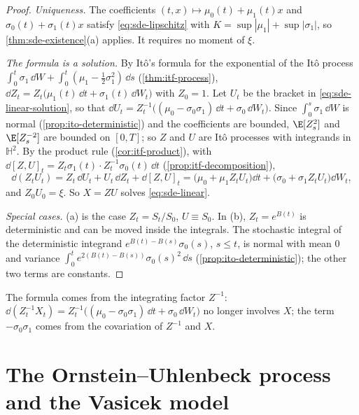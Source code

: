 \begin{proof}
\emph{Uniqueness.} The coefficients $(t,x)\mapsto\mu_0(t)+\mu_1(t)x$ and
$\sigma_0(t)+\sigma_1(t)x$ satisfy \eqref{eq:sde-lipschitz} with
$K=\sup|\mu_1|+\sup|\sigma_1|$, so \cref{thm:sde-existence}(a) applies. It requires no
moment of $\xi$.

\emph{The formula is a solution.} By It\^o's formula for the exponential of the It\^o
process $\int_0^t\sigma_1\,\dd W+\int_0^t(\mu_1-\frac12\sigma_1^2)\,\dd s$ (\cref{thm:itf-process}),
$\dd Z_t=Z_t\big(\mu_1(t)\,\dd t+\sigma_1(t)\,\dd W_t\big)$ with $Z_0=1$. Let $U_t$ be the
bracket in \eqref{eq:sde-linear-solution}, so that
$\dd U_t=Z_t^{-1}\big((\mu_0-\sigma_0\sigma_1)\,\dd t+\sigma_0\,\dd W_t\big)$. Since
$\int_0^s\sigma_1\,\dd W$ is normal (\cref{prop:ito-deterministic}) and the coefficients are
bounded, $\E[Z_s^2]$ and $\E[Z_s^{-2}]$ are bounded on $[0,T]$; so $Z$ and $U$ are It\^o
processes with integrands in $\mathbb H^2$. By the product rule
(\cref{cor:itf-product}), with $\dd[Z,U]_t=Z_t\sigma_1(t)\cdot Z_t^{-1}\sigma_0(t)\,\dd t$
(\cref{prop:itf-decomposition}),
\[
  \dd(Z_tU_t)=Z_t\,\dd U_t+U_t\,\dd Z_t+\dd[Z,U]_t
  =\big(\mu_0+\mu_1Z_tU_t\big)\dd t+\big(\sigma_0+\sigma_1Z_tU_t\big)\dd W_t ,
\]
and $Z_0U_0=\xi$. So $X=ZU$ solves \eqref{eq:sde-linear}.

\emph{Special cases.} (a) is the case $Z_t=S_t/S_0$, $U\equiv S_0$. In (b), $Z_t=e^{B(t)}$ is
deterministic and can be moved inside the integrals. The stochastic integral of the
deterministic integrand $e^{B(t)-B(s)}\sigma_0(s)$, $s\le t$, is normal with mean $0$ and
variance $\int_0^te^{2(B(t)-B(s))}\sigma_0(s)^2\,\dd s$ (\cref{prop:ito-deterministic}); the
other two terms are constants.
\end{proof}

The formula comes from the integrating factor $Z^{-1}$:
$\dd(Z_t^{-1}X_t)=Z_t^{-1}\big((\mu_0-\sigma_0\sigma_1)\,\dd t+\sigma_0\,\dd W_t\big)$ no
longer involves $X$; the term $-\sigma_0\sigma_1$ comes from the covariation of $Z^{-1}$ and $X$.

\section{The Ornstein--Uhlenbeck process and the Vasicek model}\label{sec:sde-ou}

